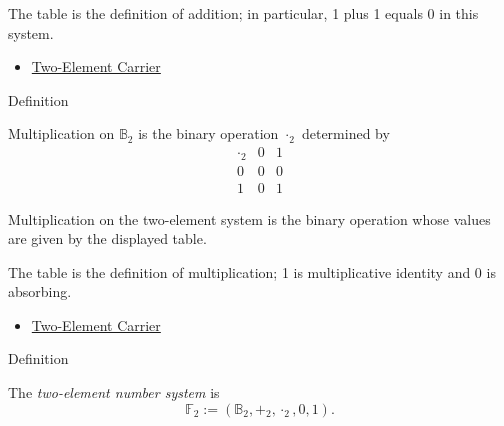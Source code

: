 \begin{remark*}[Interpretation]
The table is the definition of addition; in particular, 1 plus 1 equals 0 in this system.
\end{remark*}

\begin{dependencies}
\begin{itemize}
  \item \hyperref[def:two-element-carrier]{Two-Element Carrier}
\end{itemize}
\end{dependencies}

\begin{definitionbox}{Definition}
\begin{definition}
\label{def:multiplication-on-two-element-system}
Multiplication on \(\mathbb{B}_2\) is the binary operation \(\cdot_2\)
determined by
\[
\begin{array}{c|cc}
\cdot_2 & 0 & 1\\ \hline
0 & 0 & 0\\
1 & 0 & 1
\end{array}
\]
\end{definition}
\end{definitionbox}

\begin{remark*}
Multiplication on the two-element system is the binary operation whose values are given by the displayed table.
\end{remark*}

\begin{remark*}[Interpretation]
The table is the definition of multiplication; 1 is multiplicative identity and 0 is absorbing.
\end{remark*}

\begin{dependencies}
\begin{itemize}
  \item \hyperref[def:two-element-carrier]{Two-Element Carrier}
\end{itemize}
\end{dependencies}

\begin{definitionbox}{Definition}
\begin{definition}
\label{def:two-element-number-system}
The \emph{two-element number system} is
\[
\mathbb{F}_2:=(\mathbb{B}_2,+_2,\cdot_2,0,1).
\]
\end{definition}
\end{definitionbox}

